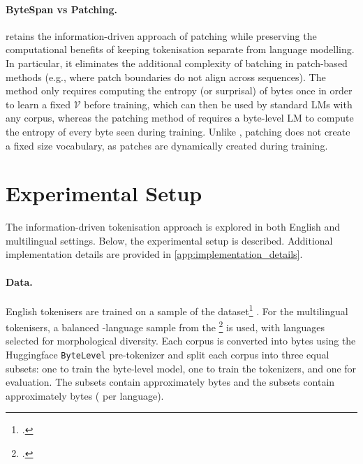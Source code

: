 \paragraph{ByteSpan vs Patching.}
\tokname retains the information-driven approach of patching while preserving the computational benefits of keeping tokenisation separate from language modelling. In particular, it eliminates the additional complexity of batching in patch-based methods (e.g., where patch boundaries do not align across sequences). The method only requires computing the entropy (or surprisal) of bytes once in order to learn a fixed \(\mathcal{V}\) before training, which can then be used by standard LMs with any corpus, whereas the patching method of \citet{pagnoni2024byte} requires a byte-level LM to compute the entropy of every byte seen during training. Unlike \tokname, patching does not create a fixed size vocabulary, as patches are dynamically created during training.

\section{Experimental Setup}\label{sec:16-setup}

The information-driven tokenisation approach is explored in both English and multilingual settings. Below, the experimental setup is described. Additional implementation details are provided in \cref{app:implementation_details}.

\paragraph{Data.} 
English tokenisers are trained on a sample of the \fineweb dataset\footnote{\href{https://huggingface.co/datasets/HuggingFaceFW/fineweb-edu}{}.} \citep{penedo2024finewebdatasetsdecantingweb}.
For the multilingual tokenisers, a balanced -language sample from the \commoncorpus \footnote{\href{https://huggingface.co/datasets/PleIAs/common_corpus}{}.} \citep{common_corpus} is used, with languages selected for morphological diversity. Each corpus is converted into bytes using the Huggingface \texttt{ByteLevel} pre-tokenizer and split each corpus into three equal subsets: one to train the byte-level model, one to train the tokenizers, and one for evaluation. The \fineweb subsets contain approximately  bytes and the \commoncorpus subsets contain approximately  bytes ( per language).

